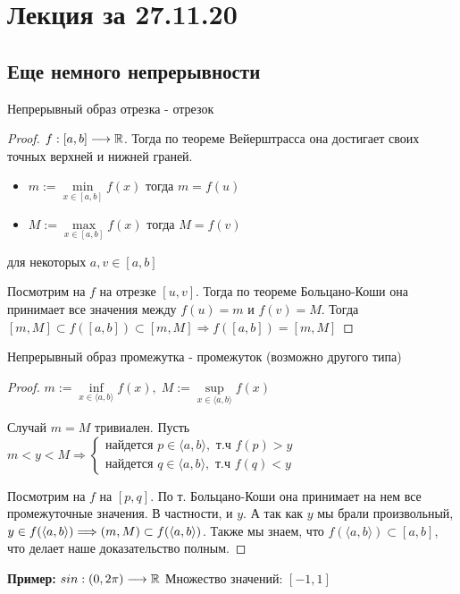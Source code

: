 \section{Лекция за 27.11.20}
\subsection*{Еще немного непрерывности}
\begin{theorem-non}
    Непрерывный образ отрезка - отрезок 

    \begin{proof} \quad

        $f:[a, b] \longrightarrow \mathbb{R}$.
        Тогда по теореме Вейерштрасса она достигает своих точных верхней и нижней граней.
        \begin{itemize}
            \item[] $m:= \min\limits_{x \in [a, b]}{f(x)}$ \qquad тогда $m = f(u)$
            \item[] $M:= \max\limits_{x \in [a, b]}{f(x)}$ \qquad тогда $M = f(v)$
        \end{itemize} для некоторых $a, v \in [a, b]$

        Посмотрим на $f$ на отрезке $[u, v]$. Тогда по теореме Больцано-Коши она принимает все значения между $f(u) = m$
        и $f(v) = M$. Тогда $[m, M] \subset f([a, b]) \subset [m, M] \Longrightarrow f([a, b]) = [m, M]$ 
    \end{proof}
\end{theorem-non}
\begin{theorem-non}
    Непрерывный образ промежутка - промежуток (возможно другого типа)

    \begin{proof} \quad

        $m:= \inf\limits_{x \in \langle a, b \rangle}{f(x)}, \; M:= \sup\limits_{x \in \langle a, b \rangle}{f(x)}$

        Случай $m = M$ тривиален. Пусть $m < y < M \Longrightarrow \begin{cases}
            \text{найдется } p \in \langle a, b \rangle, \text{ т.ч } f(p) > y \\
            \text{найдется } q \in \langle a, b \rangle, \text{ т.ч } f(q) < y
        \end{cases}$

        Посмотрим на $f$ на $[p, q]$. По т. Больцано-Коши она принимает на нем все промежуточные значения.
        В частности, и $y$.
        А так как $y$ мы брали произвольный, $y \in f(\langle a, b \rangle) \Longrightarrow \\
        (m, M) \subset f(\langle a, b \rangle)$. Также мы знаем, что $f(\langle a, b \rangle) \subset [a, b]$, что делает наше доказательство полным.
    \end{proof}
    \textbf{Пример:} $sin: (0, 2\pi) \longrightarrow \mathbb{R}$ \qquad Множество значений: $[-1, 1]$ 
\end{theorem-non}

